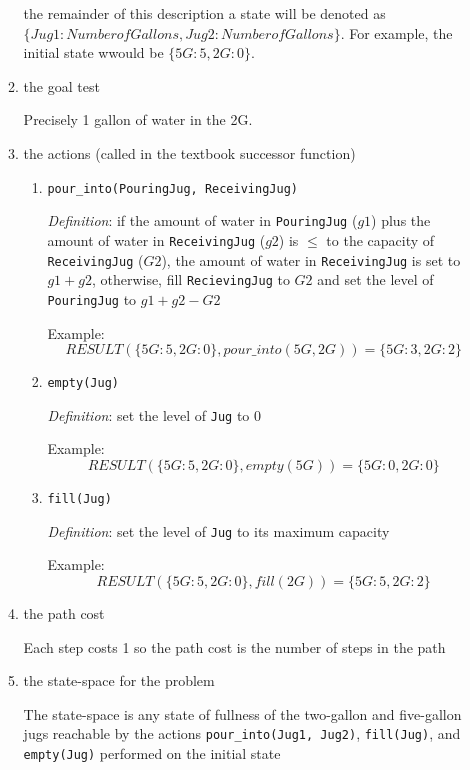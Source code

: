\documentclass[11pt]{article}  %
\begin{document}
\begin{enumerate}
\begin{enumerate}
      the remainder of this description a state will be denoted as \(\lbrace
      Jug1 : NumberofGallons, Jug2 : NumberofGallons\rbrace\).  For example, the
      initial state wwould be \(\lbrace 5G:5, 2G:0\rbrace\). 
      \item the goal test
      \par
      Precisely 1 gallon of water in the 2G.
      \item the actions (called in the textbook successor function)
      \begin{enumerate}
        \item \texttt{pour\_into(PouringJug, ReceivingJug)} \par
        \emph{Definition}: if the amount of water in \texttt{PouringJug}
        (\(g1\)) plus the amount of water in \texttt{ReceivingJug} (\(g2\)) is
        \(\le\) to the capacity of \texttt{ReceivingJug} (\(G2\)), the amount of
        water in \texttt{ReceivingJug} is set to \(g1 + g2\), otherwise,  fill
        \texttt{RecievingJug} to \(G2\) and set the level of \texttt{PouringJug}
        to \(g1 + g2 - G2\)
        \par 
        Example: \[RESULT(\lbrace 5G : 5, 2G:0\rbrace, pour\_into(5G,
        2G)) = \lbrace 5G : 3, 2G:2\rbrace\]
        \item \texttt{empty(Jug)}
        \par\emph{Definition}: set the level of \texttt{Jug} to \(0\)
        \par
        Example: \[RESULT(\lbrace 5G : 5, 2G : 0\rbrace, empty(5G)) = \lbrace
        5G:0, 2G : 0 \rbrace\]
        \item \texttt{fill(Jug)}
        \par\emph{Definition}: set the level of \texttt{Jug} to its maximum
        capacity
        \par
        Example: \[RESULT(\lbrace 5G : 5, 2G : 0\rbrace, fill(2G)) = \lbrace
        5G:5, 2G : 2 \rbrace\]
      \end{enumerate}
      \item the path cost
      \par
      Each step costs 1 so the path cost is the number of steps in the path
      \item the state-space for the problem
      \par
      The state-space is any state of fullness of the two-gallon and
      five-gallon jugs reachable by the actions \texttt{pour\_into(Jug1, Jug2)},
      \texttt{fill(Jug)}, and \texttt{empty(Jug)} performed on the initial state

\end{enumerate}
\end{enumerate}
\end{document}
